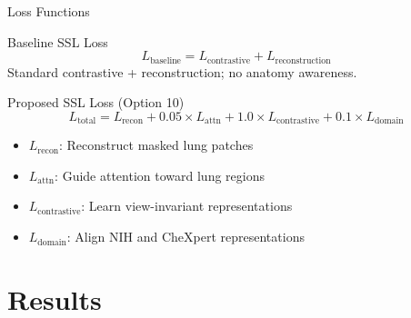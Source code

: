 \documentclass{beamer}
\begin{document}
\begin{frame}{Loss Functions}
\begin{block}{Baseline SSL Loss}
\[
L_{\text{baseline}} = L_{\text{contrastive}} + L_{\text{reconstruction}}
\]
Standard contrastive + reconstruction; no anatomy awareness.
\end{block}
\vspace{6pt}
\begin{block}{Proposed SSL Loss (Option 10)}
\[
L_{\text{total}} = L_{\text{recon}} + 0.05 \times L_{\text{attn}} + 1.0 \times L_{\text{contrastive}} + 0.1 \times L_{\text{domain}}
\]
\begin{itemize}
    \item $L_{\text{recon}}$: Reconstruct masked lung patches
    \item $L_{\text{attn}}$: Guide attention toward lung regions
    \item $L_{\text{contrastive}}$: Learn view-invariant representations
    \item $L_{\text{domain}}$: Align NIH and CheXpert representations
\end{itemize}
\end{block}
\end{frame}


\section{Results}
\end{document}
